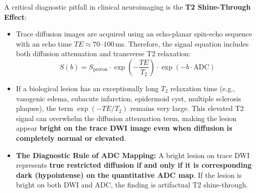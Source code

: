 \documentclass[11pt,a4paper]{article}
\begin{document}
A critical diagnostic pitfall in clinical neuroimaging is the \textbf{T2 Shine-Through Effect}:
\begin{itemize}[leftmargin=*]
    \item Trace diffusion images are acquired using an echo-planar spin-echo sequence with an echo time $TE \approx 70\text{--}100\,\text{ms}$. Therefore, the signal equation includes both diffusion attenuation and transverse T2 relaxation:
    \begin{equation}
        S(b) = S_{\text{proton}} \cdot \exp\left( -\frac{TE}{T_2} \right) \cdot \exp\left( -b \cdot \text{ADC} \right)
    \end{equation}
    \item If a biological lesion has an exceptionally long $T_2$ relaxation time (e.g., vasogenic edema, subacute infarction, epidermoid cyst, multiple sclerosis plaques), the term $\exp(-TE / T_2)$ remains very large. This elevated T2 signal can overwhelm the diffusion attenuation term, making the lesion appear \textbf{bright on the trace DWI image even when diffusion is completely normal or elevated}.
    \item \textbf{The Diagnostic Rule of ADC Mapping:} A bright lesion on trace DWI represents \textbf{true restricted diffusion if and only if it is corresponding dark (hypointense) on the quantitative ADC map}. If the lesion is bright on both DWI and ADC, the finding is artifactual T2 shine-through.
\end{itemize}
\end{document}
